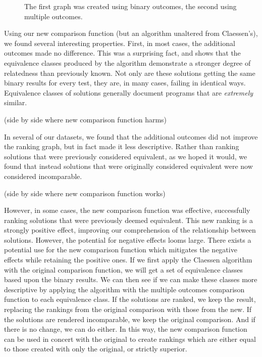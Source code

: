 \documentclass[11pt]{article}
\begin{document}
\begin{figure}
\caption{The first graph was created using binary outcomes, the second using multiple outcomes.}
\end{figure}

Using our new comparison function (but an algorithm unaltered from Claessen's), we found several interesting properties. First, in most cases, the additional outcomes made no difference. This was a surprising fact, and shows that the equivalence classes produced by the algorithm demonstrate a stronger degree of relatedness than previously known. Not only are these solutions getting the same binary results for every test, they are, in many cases, failing in  identical ways. Equivalence classes of solutions generally document programs that are \emph{extremely} similar.

(side by side where new comparison function harms)

In several of our datasets, we found that the additional outcomes did not improve the ranking graph, but in fact made it less descriptive. Rather than ranking solutions that were previously considered equivalent, as we hoped it would, we found that instead solutions that were originally considered equivalent were now considered incomparable.

(side by side where new comparison function works)

However, in some cases, the new comparison function was effective, successfully ranking solutions that were previously deemed equivalent. This new ranking is a strongly positive effect, improving our comprehension of the relationship between solutions. However, the potential for negative effects looms large. There exists a potential use for the new comparison function which mitigates the negative effects while retaining the positive ones. If we first apply the Claessen algorithm with the original comparison function, we will get a set of equivalence classes based upon the binary results. We can then see if we can make these classes more descriptive by applying the algorithm with the multiple outcomes comparison function to each equivalence class. If the solutions are ranked, we keep the result, replacing the rankings from the original comparison with those from the new. If the solutions are rendered incomparable, we keep the original comparison. And if there is no change, we can do either. In this way, the new comparison function can be used in concert with the original to create rankings which are either equal to those created with only the original, or strictly superior.
\end{document}

